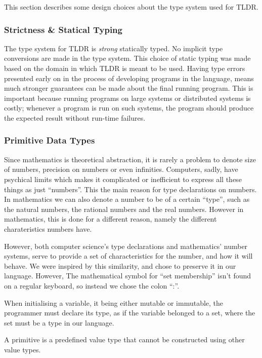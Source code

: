This section describes some design choices about the type system used for TLDR.

\subsubsection{Strictness \& Statical Typing}
The type system for TLDR is \emph{strong} statically typed. No implicit type conversions are made in the type system. This choice of static typing was made based on the domain in which TLDR is meant to be used. Having type errors presented early on in the process of developing programs in the language, means much stronger guarantees can be made about the final running program. This is important because running programs on large systems or distributed systems is costly; whenever a program is run on such systems, the program should produce the expected result without run-time failures.

\subsubsection{Primitive Data Types}
\label{subsec:primitives}

Since mathematics is theoretical abstraction, it is rarely a problem to denote size of numbers, precision on numbers or even infinities. Computers, sadly, have psychical limits which makes it complicated or inefficient to express all these things as just \enquote{numbers}. This the main reason for type declarations on numbers. In mathematics we can also denote a number to be of a certain \enquote{type}, such as the natural numbers, the rational numbers and the real numbers. However in mathematics, this is done for a different reason, namely the different charateristics numbers have.

However, both computer science's type declarations and mathematics' number systems, serve to provide a set of characteristics for the number, and how it will behave. We were inspired by this similarity, and chose to preserve it in our language. However, The mathematical symbol for \enquote{set membership} isn't found on a regular keyboard, so instead we chose the colon \enquote{:}.

When initialising a variable, it being either mutable or immutable, the programmer must declare its type, as if the variable belonged to a set, where the set must be a type in our language.

A primitive is a predefined value type that cannot be constructed using other value types.

